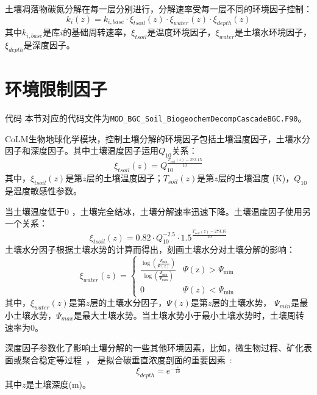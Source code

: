 土壤凋落物碳氮分解在每一层分别进行，分解速率受每一层不同的环境因子控制：
\begin{equation}
k_{i}(z)=k_{i,base} \cdot \xi_{tsoil}(z) \cdot \xi_{water}(z) \cdot \xi_{depth}(z)
\end{equation}
其中$k_{i,base}$是库$i$的基础周转速率，$\xi_{tsoil}$是温度环境因子，$\xi_{water}$是土壤水环境因子，$\xi_{depth}$是深度因子。


\section{环境限制因子}\label{环境限制因子}

\begin{mymdframed}{代码}
本节对应的代码文件为\texttt{MOD\_BGC\_Soil\_BiogeochemDecompCascadeBGC.F90}。
\end{mymdframed}

CoLM生物地球化学模块，控制土壤分解的环境因子包括土壤温度因子，土壤水分因子和深度因子。其中土壤温度因子运用$Q_{10}$关系：
\begin{equation}
\xi_{t s o i l}(z)=Q_{10}^{\frac{T_{{soil }}(z)-273.15}{10}}
\end{equation}
其中，$\xi_{tsoil}\left(z\right)$是第$z$层的土壤温度因子；$T_{soil}\left(z\right)$是第$z$层的土壤温度 (K)，$Q_{10}$是温度敏感性参数。


当土壤温度低于0 \textcelsius，土壤完全结冰，土壤分解速率迅速下降。土壤温度因子使用另一个关系：
\begin{equation}
\xi_{t s o i l}(z)=0.82 \cdot Q_{10}^{-2.5} \cdot 1.5^{\frac{T_{{soil }}(z)-273.15}{10}}
\end{equation}
土壤水分因子根据土壤水势的计算而得出，刻画土壤水分对土壤分解的影响：
\begin{equation}
\xi_{w a t e r}(z)=\begin{cases}
\frac{\log \left(\frac{\Psi_{\min }}{\Psi(z)}\right)}{\log \left(\frac{\Psi_{\min }}{\Psi_{\max }}\right)} 
    & \Psi(\mathrm{z})>\Psi_{\min } \\
0  & \Psi(z)<\Psi_{\min }
\end{cases}
\end{equation}
其中，$\xi_{water}\left(z\right)$是第$z$层的土壤水分因子，$\Psi\left(z\right)$是第$z$层的土壤水势，
$\Psi_{min}$是最小土壤水势，$\Psi_{max}$是最大土壤水势。当土壤水势小于最小土壤水势时，土壤周转速率为0。


深度因子参数化了影响土壤分解的一些其他环境因素，比如，微生物过程、矿化表面或聚合稳定等过程~\citep{koven2013effect}，
是拟合碳垂直浓度剖面的重要因素~\citep{jenkinson2008turnover}:
\begin{equation}
\xi_{d e p t h}=e^{-\frac{z}{10}}
\end{equation}
其中$z$是土壤深度(m)。


